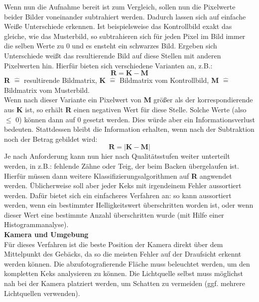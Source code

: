 \documentclass{ezb}
\begin{document}
\newline
Wenn nun die Aufnahme bereit ist zum Vergleich, sollen nun die Pixelwerte beider Bilder voneinander subtrahiert werden. Dadurch lassen sich auf einfache Weiße Unterschiede erkennen. Ist beispielsweise das Kontrollbild exakt das gleiche, wie das Musterbild, so subtrahieren sich für jeden Pixel im Bild immer die selben Werte zu 0 und es ensteht ein schwarzes Bild. Ergeben sich Unterschiede weißt das resultierende Bild auf diese Stellen mit anderen Pixelwerten hin. Hierfür bieten sich  verschiedene Varianten an, z.B.:
\begin{equation}
\textbf{R} = \textbf{K} - \textbf{M}
\end{equation}
\textbf{R} $\widehat{=}$ resultirende Bildmatrix, \textbf{K} $\widehat{=}$ Bildmatrix vom Kontrollbild, \textbf{M} $\widehat{=}$ Bildmatrix vom Musterbild. \\
\newline
Wenn nach dieser Variante ein Pixelwert von \textbf{M} größer als der korrespondierende aus \textbf{K} ist, so erhält \textbf{R} einen negativen Wert für diese Stelle. Solche Werte (also $\leq$ 0) können dann auf 0 gesetzt werden. Dies würde aber ein Informationsverlust bedeuten. Stattdessen bleibt die Information erhalten, wenn nach der Subtraktion noch der Betrag gebildet wird:
\begin{equation}
\textbf{R} = \vert \textbf{K} - \textbf{M} \vert 
\end{equation}
Je nach Anforderung kann nun hier nach Qualitätsstufen weiter unterteilt werden, in z.B.: fehlende Zähne oder Teig, der beim Backen übergelaufen ist. Hierfür müssen dann weitere Klassifizierungsalgorithmen auf \textbf{R} angwendet werden. Üblicherweise soll aber jeder Keks mit irgendeinem Fehler aussortiert werden. Dafür bietet sich ein einfacheres Verfahren an: so kann aussortiert werden, wenn ein bestimmter Helligkeitswert überschritten worden ist, oder wenn dieser Wert eine bestimmte Anzahl überschritten wurde (mit Hilfe einer Histogrammanalyse).\\
\textbf{{\large Kamera und Umgebung}}\\
\newline
Für dieses Verfahren ist die beste Position der Kamera direkt über dem Mittelpunkt des Gebäcks, da so die meisten Fehler auf der Draufsicht erkennt werden können. Die abzufotografierende Fläche muss beleuchtet werden, um den kompletten Keks analysieren zu können. Die Lichtquelle selbst muss möglichst nah bei der Kamera platziert werden, um Schatten zu vermeiden (ggf. mehrere Lichtquellen verwenden). \\
\end{document}
